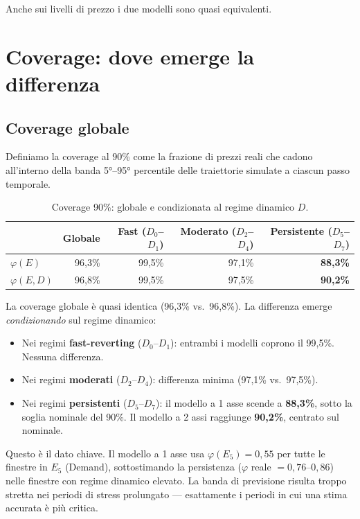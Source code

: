 \documentclass[12pt]{article}
\begin{document}
Anche sui livelli di prezzo i due modelli sono quasi equivalenti.


\section{Coverage: dove emerge la differenza}

\subsection{Coverage globale}

Definiamo la coverage al 90\% come la frazione di prezzi reali che cadono all'interno della banda 5°--95° percentile delle traiettorie simulate a ciascun passo temporale.

\begin{table}[H]
\centering
\caption{Coverage 90\%: globale e condizionata al regime dinamico $D$.}
\label{tab:coverage}
\begin{tabular}{lrrrr}
\toprule
 & Globale & Fast ($D_0$--$D_1$) & Moderato ($D_2$--$D_4$) & Persistente ($D_5$--$D_7$) \\
\midrule
$\varphi(E)$   & 96,3\% & 99,5\% & 97,1\% & \textbf{88,3\%} \\
$\varphi(E,D)$ & 96,8\% & 99,5\% & 97,5\% & \textbf{90,2\%} \\
\bottomrule
\end{tabular}
\end{table}

La coverage globale è quasi identica (96,3\% vs.\ 96,8\%).
La differenza emerge \emph{condizionando} sul regime dinamico:
\begin{itemize}[nosep]
\item Nei regimi \textbf{fast-reverting} ($D_0$--$D_1$): entrambi i modelli coprono il 99,5\%. Nessuna differenza.
\item Nei regimi \textbf{moderati} ($D_2$--$D_4$): differenza minima (97,1\% vs.\ 97,5\%).
\item Nei regimi \textbf{persistenti} ($D_5$--$D_7$): il modello a 1 asse scende a \textbf{88,3\%}, sotto la soglia nominale del 90\%. Il modello a 2 assi raggiunge \textbf{90,2\%}, centrato sul nominale.
\end{itemize}

Questo è il dato chiave.
Il modello a 1 asse usa $\varphi(E_5) = 0{,}55$ per tutte le finestre in $E_5$ (Demand), sottostimando la persistenza ($\varphi$ reale $= 0{,}76$--$0{,}86$) nelle finestre con regime dinamico elevato.
La banda di previsione risulta troppo stretta nei periodi di stress prolungato --- esattamente i periodi in cui una stima accurata è più critica.
\end{document}
